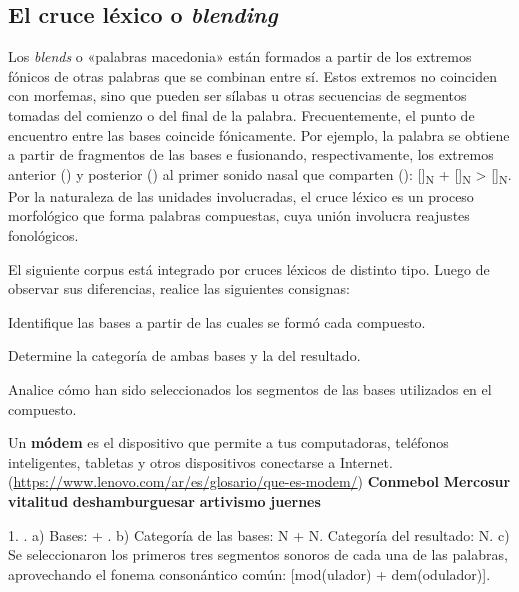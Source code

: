\subsection{El cruce léxico o \textit{blending}}

Los \textit{blends} o «palabras macedonia» están formados a partir de los
extremos fónicos de otras palabras que se combinan entre sí. Estos extremos no
coinciden con morfemas, sino que pueden ser sílabas u otras secuencias de
segmentos tomadas del comienzo o del final de la palabra. Frecuentemente, el
punto de encuentro entre las bases coincide fónicamente. Por ejemplo, la palabra
 se obtiene a partir de fragmentos de las bases
 e  fusionando, respectivamente, los
extremos anterior () y posterior () al primer
sonido nasal que comparten ():
[]\textsubscript{N} +
[]\textsubscript{N} >
[]\textsubscript{N}. Por la naturaleza de las unidades
involucradas, el cruce léxico es un proceso morfológico que forma palabras
compuestas, cuya unión involucra reajustes fonológicos.

\begin{ejercicio}\label{ej:04-cruces}
El siguiente corpus está integrado por cruces léxicos de distinto tipo. Luego de
observar sus diferencias, realice las siguientes consignas:

\begin{consignas}
  \item Identifique las bases a partir de las cuales se formó cada compuesto.
  \item Determine la categoría de ambas bases y la del resultado.
  \item Analice cómo han sido seleccionados los segmentos de las bases
        utilizados en el compuesto.
\end{consignas}

\begin{exe}
  \ex Un \textbf{módem} es el dispositivo que permite a tus computadoras,
      teléfonos inteligentes, tabletas y otros dispositivos conectarse a
      Internet. (\url{https://www.lenovo.com/ar/es/glosario/que-es-modem/})
  \ex \textbf{Conmebol}
  \ex \textbf{Mercosur}
  \ex \textbf{vitalitud}
  \ex \textbf{deshamburguesar}
  \ex \textbf{artivismo}
  \ex \textbf{juernes}
\end{exe}


\begin{resuelto}
1. . a) Bases:  + . b)
Categoría de las bases: N + N. Categoría del resultado: N. c) Se seleccionaron
los primeros tres segmentos sonoros de cada una de las palabras, aprovechando el
fonema consonántico común: [mod(ulador) + dem(odulador)].
\end{resuelto}
\end{ejercicio}

